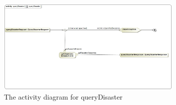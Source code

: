 \begin{figure}[ht!]
\centering
\includegraphics[width=90mm]{../images/queryDisasterActivityDiagram.jpg}
\caption{The activity diagram for queryDisaster \label{overflow}}
\end{figure} 